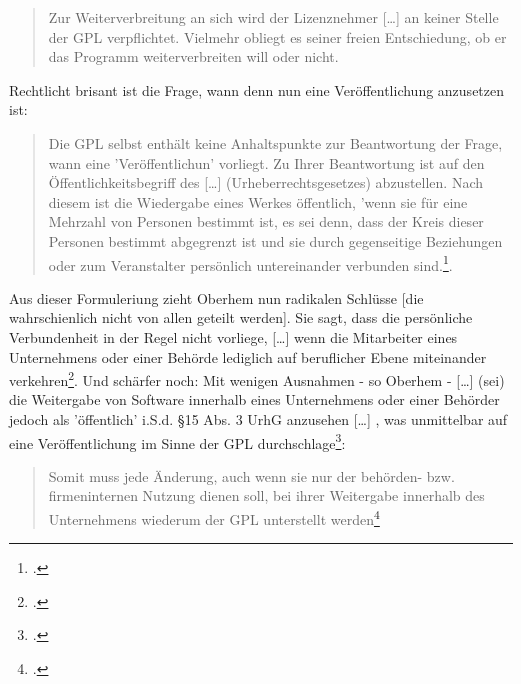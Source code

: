 \documentclass[DIV=calc,BCOR=5mm,11pt,headings=small,oneside,abstract=true, toc=bib]{scrartcl}
\begin{document}
\begin{quote} Zur Weiterverbreitung an sich wird der Lizenznehmer [\ldots] an
keiner Stelle der GPL verpflichtet. Vielmehr obliegt es seiner freien
Entschiedung, ob er das Programm weiterverbreiten will oder nicht.
\end{quote}



Rechtlicht brisant ist die Frage, wann denn nun eine Veröffentlichung
anzusetzen ist:

\begin{quote} \glqq{}Die GPL selbst enthält keine Anhaltspunkte zur
Beantwortung der Frage, wann eine 'Veröffentlichun' vorliegt. Zu Ihrer
Beantwortung ist auf den Öffentlichkeitsbegriff des [\ldots]
(Urheberrechtsgesetzes) abzustellen. Nach diesem ist die Wiedergabe eines
Werkes öffentlich, 'wenn sie für eine Mehrzahl von Personen bestimmt ist,
es sei denn, dass der Kreis dieser Personen bestimmt abgegrenzt ist und
sie durch gegenseitige Beziehungen oder zum Veranstalter persönlich
untereinander verbunden sind.\grqq{}\footcite[vgl.][45]{Oberhem2008a}.
\end{quote}

Aus dieser Formuleriung zieht Oberhem nun radikalen Schlüsse [die
wahrschienlich nicht von allen geteilt werden]. Sie sagt, dass die
\glqq{}persönliche Verbundenheit\grqq{} in der Regel nicht vorliege,
\glqq{}[\ldots] wenn die Mitarbeiter eines Unternehmens oder einer
Behörde lediglich auf beruflicher Ebene miteinander
verkehren\grqq{}\footcite[vgl.][45]{Oberhem2008a}. Und schärfer noch: Mit
wenigen Ausnahmen - so Oberhem - \glqq{}[\ldots] (sei) die Weitergabe von
Software innerhalb eines Unternehmens oder einer Behörder jedoch als
'öffentlich' i.S.d. §15 Abs. 3 UrhG anzusehen [\ldots] \grqq{}, was unmittelbar
auf eine Veröffentlichung im Sinne der GPL
durchschlage\footcite[vgl.][46]{Oberhem2008a}:

\begin{quote} \glqq{}Somit muss jede Änderung, auch wenn sie nur der
behörden- bzw. firmeninternen Nutzung dienen soll, bei ihrer Weitergabe
innerhalb des Unternehmens wiederum der GPL unterstellt
werden\grqq{}\footcite[vgl.][46]{Oberhem2008a}
\end{quote}
\end{document}
